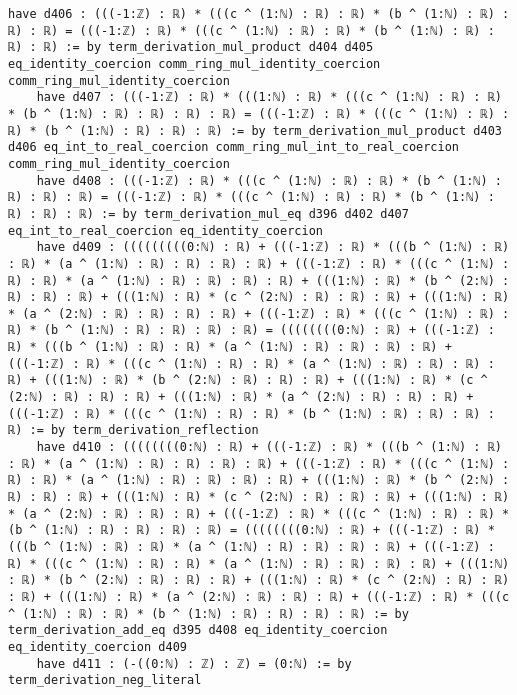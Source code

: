\documentclass{article}
\begin{document}
\begin{tcolorbox}[colback=white!10, width=\linewidth]
\begin{lstlisting}[language=Lean4]
    have d406 : (((-1:ℤ) : ℝ) * (((c ^ (1:ℕ) : ℝ) : ℝ) * (b ^ (1:ℕ) : ℝ) : ℝ) : ℝ) = (((-1:ℤ) : ℝ) * (((c ^ (1:ℕ) : ℝ) : ℝ) * (b ^ (1:ℕ) : ℝ) : ℝ) : ℝ) := by term_derivation_mul_product d404 d405 eq_identity_coercion comm_ring_mul_identity_coercion comm_ring_mul_identity_coercion
    have d407 : (((-1:ℤ) : ℝ) * (((1:ℕ) : ℝ) * (((c ^ (1:ℕ) : ℝ) : ℝ) * (b ^ (1:ℕ) : ℝ) : ℝ) : ℝ) : ℝ) = (((-1:ℤ) : ℝ) * (((c ^ (1:ℕ) : ℝ) : ℝ) * (b ^ (1:ℕ) : ℝ) : ℝ) : ℝ) := by term_derivation_mul_product d403 d406 eq_int_to_real_coercion comm_ring_mul_int_to_real_coercion comm_ring_mul_identity_coercion
    have d408 : (((-1:ℤ) : ℝ) * (((c ^ (1:ℕ) : ℝ) : ℝ) * (b ^ (1:ℕ) : ℝ) : ℝ) : ℝ) = (((-1:ℤ) : ℝ) * (((c ^ (1:ℕ) : ℝ) : ℝ) * (b ^ (1:ℕ) : ℝ) : ℝ) : ℝ) := by term_derivation_mul_eq d396 d402 d407 eq_int_to_real_coercion eq_identity_coercion
    have d409 : (((((((((0:ℕ) : ℝ) + (((-1:ℤ) : ℝ) * (((b ^ (1:ℕ) : ℝ) : ℝ) * (a ^ (1:ℕ) : ℝ) : ℝ) : ℝ) : ℝ) + (((-1:ℤ) : ℝ) * (((c ^ (1:ℕ) : ℝ) : ℝ) * (a ^ (1:ℕ) : ℝ) : ℝ) : ℝ) : ℝ) + (((1:ℕ) : ℝ) * (b ^ (2:ℕ) : ℝ) : ℝ) : ℝ) + (((1:ℕ) : ℝ) * (c ^ (2:ℕ) : ℝ) : ℝ) : ℝ) + (((1:ℕ) : ℝ) * (a ^ (2:ℕ) : ℝ) : ℝ) : ℝ) : ℝ) + (((-1:ℤ) : ℝ) * (((c ^ (1:ℕ) : ℝ) : ℝ) * (b ^ (1:ℕ) : ℝ) : ℝ) : ℝ) : ℝ) = ((((((((0:ℕ) : ℝ) + (((-1:ℤ) : ℝ) * (((b ^ (1:ℕ) : ℝ) : ℝ) * (a ^ (1:ℕ) : ℝ) : ℝ) : ℝ) : ℝ) + (((-1:ℤ) : ℝ) * (((c ^ (1:ℕ) : ℝ) : ℝ) * (a ^ (1:ℕ) : ℝ) : ℝ) : ℝ) : ℝ) + (((1:ℕ) : ℝ) * (b ^ (2:ℕ) : ℝ) : ℝ) : ℝ) + (((1:ℕ) : ℝ) * (c ^ (2:ℕ) : ℝ) : ℝ) : ℝ) + (((1:ℕ) : ℝ) * (a ^ (2:ℕ) : ℝ) : ℝ) : ℝ) + (((-1:ℤ) : ℝ) * (((c ^ (1:ℕ) : ℝ) : ℝ) * (b ^ (1:ℕ) : ℝ) : ℝ) : ℝ) : ℝ) := by term_derivation_reflection
    have d410 : ((((((((0:ℕ) : ℝ) + (((-1:ℤ) : ℝ) * (((b ^ (1:ℕ) : ℝ) : ℝ) * (a ^ (1:ℕ) : ℝ) : ℝ) : ℝ) : ℝ) + (((-1:ℤ) : ℝ) * (((c ^ (1:ℕ) : ℝ) : ℝ) * (a ^ (1:ℕ) : ℝ) : ℝ) : ℝ) : ℝ) + (((1:ℕ) : ℝ) * (b ^ (2:ℕ) : ℝ) : ℝ) : ℝ) + (((1:ℕ) : ℝ) * (c ^ (2:ℕ) : ℝ) : ℝ) : ℝ) + (((1:ℕ) : ℝ) * (a ^ (2:ℕ) : ℝ) : ℝ) : ℝ) + (((-1:ℤ) : ℝ) * (((c ^ (1:ℕ) : ℝ) : ℝ) * (b ^ (1:ℕ) : ℝ) : ℝ) : ℝ) : ℝ) = ((((((((0:ℕ) : ℝ) + (((-1:ℤ) : ℝ) * (((b ^ (1:ℕ) : ℝ) : ℝ) * (a ^ (1:ℕ) : ℝ) : ℝ) : ℝ) : ℝ) + (((-1:ℤ) : ℝ) * (((c ^ (1:ℕ) : ℝ) : ℝ) * (a ^ (1:ℕ) : ℝ) : ℝ) : ℝ) : ℝ) + (((1:ℕ) : ℝ) * (b ^ (2:ℕ) : ℝ) : ℝ) : ℝ) + (((1:ℕ) : ℝ) * (c ^ (2:ℕ) : ℝ) : ℝ) : ℝ) + (((1:ℕ) : ℝ) * (a ^ (2:ℕ) : ℝ) : ℝ) : ℝ) + (((-1:ℤ) : ℝ) * (((c ^ (1:ℕ) : ℝ) : ℝ) * (b ^ (1:ℕ) : ℝ) : ℝ) : ℝ) : ℝ) := by term_derivation_add_eq d395 d408 eq_identity_coercion eq_identity_coercion d409
    have d411 : (-((0:ℕ) : ℤ) : ℤ) = (0:ℕ) := by term_derivation_neg_literal

\end{lstlisting}
\end{tcolorbox}
\end{document}
